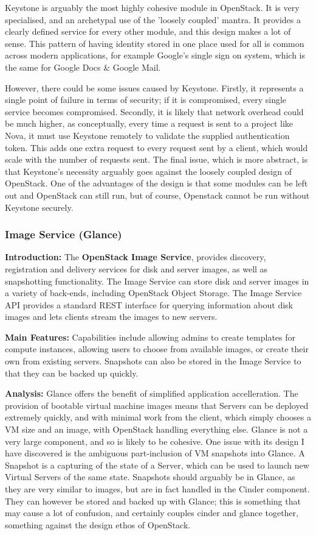 Keystone is arguably the most highly cohesive module in OpenStack. It is very specialised, and an archetypal use of the 'loosely coupled' mantra. It provides a clearly defined service for every other module, and this design makes a lot of sense. This pattern of having identity stored in one place used for all is common across modern applications, for example Google's single sign on system, which is the same for Google Docs \& Google Mail\cite{googleapps}. 

However, there could be some issues caused by Keystone. Firstly, it represents a single point of failure in terms of security; if it is compromised, every single service becomes compromised. Secondly, it is likely that network overhead could be much higher, as conceptually, every time a request is sent to a project like Nova, it must use Keystone remotely to validate the supplied authentication token. This adds one extra request to every request sent by a client, which would scale with the number of requests sent. 
The final issue, which is more abstract, is that Keystone's necessity arguably goes against the loosely coupled design of OpenStack. One of the advantages of the design is that some modules can be left out and OpenStack can still run, but of course, Openstack cannot be run without Keystone securely.

\subsubsection{Image Service (Glance)}
\textbf{Introduction:}
The \textbf{OpenStack Image Service}, provides discovery, registration and delivery services for disk and server images, as well as snapshotting functionality. The Image Service can store disk and server images in a variety of back-ends, including OpenStack Object Storage.  The Image Service API provides a standard REST interface for querying information about disk images and lets clients stream the images to new servers.

\textbf{Main Features:}
Capabilities include allowing admins to create templates for compute instances, allowing users to choose from available images, or create their own from existing servers. Snapshots can also be stored in the Image Service to that they can be backed up quickly. 

\textbf{Analysis:}
Glance offers the benefit of simplified application accelleration. The provision of 
bootable virtual machine images means that Servers can be deployed extremely quickly, and with minimal work from the client, which simply chooses a VM size and an image, with OpenStack handling everything else. 
Glance is not a very large component, and so is likely to be cohesive. One issue with its design I have discovered is the ambiguous part-inclusion of VM snapshots into Glance. A Snapshot is a capturing of the state of a Server, which can be used to launch new Virtual Servers of the same state. Snapshots should arguably be in Glance, as they are very similar to images, but are in fact handled in the Cinder component. They can however be stored and backed up with Glance; this is something that may cause a lot of confusion, and certainly couples cinder and glance together, something against the design ethos of OpenStack.


